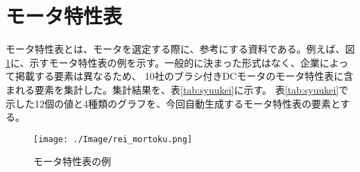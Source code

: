 \section{モータ特性表}\label{mortoku}
モータ特性表とは、モータを選定する際に、参考にする資料である\cite{仕様の見方}。例えば、図\ref{fig:rei_mortoku}に、示すモータ特性表の例を示す\cite{特性表4}。一般的に決まった形式はなく、企業によって掲載する要素は異なるため、
10社のブラシ付きDCモータのモータ特性表\cite{特性表1,特性表2,特性表3,特性表4,特性表5,特性表6,特性表7,特性表8,特性表9,特性表10}に含まれる要素を集計した。集計結果を、表\ref{tab:syuukei}に示す。
表\ref{tab:syuukei}で示した12個の値と4種類のグラフを、今回自動生成するモータ特性表の要素とする。
	\begin{figure}[t]
		\centering
		\texttt{[image: ./Image/rei\_mortoku.png]}
		\caption{モータ特性表の例}
		\label{fig:rei_mortoku}
	  \end{figure} 

